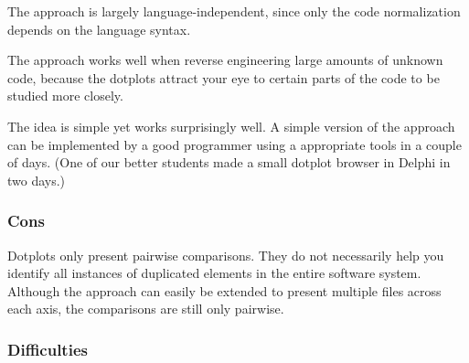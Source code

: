 \documentclass[a4paper,10pt,twoside]{book}
\begin{document}
\begin{bulletlist}
\item The approach is largely language-independent, since only the code normalization depends on the language syntax.

\item The approach works well when reverse engineering large amounts of unknown code, because the dotplots attract your eye to certain parts of the code to be studied more closely.

\item The idea is simple yet works surprisingly well. A simple version of the approach can be implemented by a good programmer using a appropriate tools in a couple of days. (One of our better students made a small dotplot browser in Delphi in two days.)
\end{bulletlist}

\subsubsection*{Cons}

\begin{bulletlist}
\item Dotplots only present pairwise comparisons. They do not necessarily help you identify all instances of duplicated elements in the entire software system. Although the approach can easily be extended to present multiple files across each axis, the comparisons are still only pairwise.
\end{bulletlist}

\subsubsection*{Difficulties}
\end{document}
